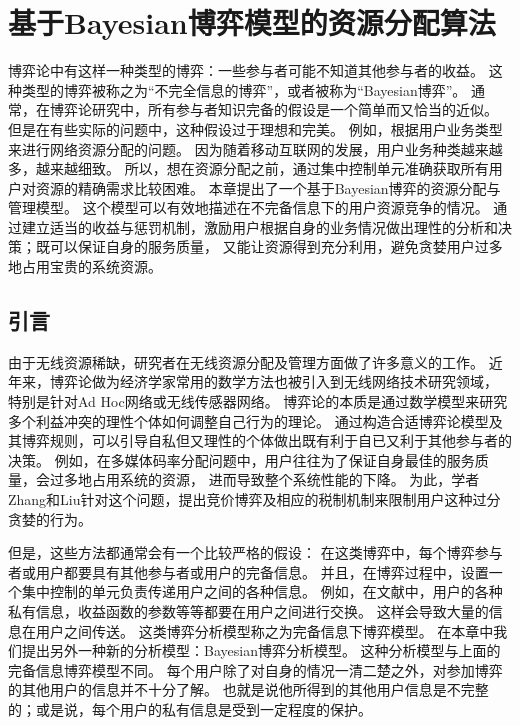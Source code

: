 \graphicspath{{../body/bayesian_figures/}}
\chapter{基于Bayesian博弈模型的资源分配算法}
\par 博弈论中有这样一种类型的博弈：一些参与者可能不知道其他参与者的收益。
这种类型的博弈被称之为“不完全信息的博弈”，或者被称为“Bayesian博弈”。
通常，在博弈论研究中，所有参与者知识完备的假设是一个简单而又恰当的近似。
但是在有些实际的问题中，这种假设过于理想和完美。
例如，根据用户业务类型来进行网络资源分配的问题。
因为随着移动互联网的发展，用户业务种类越来越多，越来越细致。
所以，想在资源分配之前，通过集中控制单元准确获取所有用户对资源的精确需求比较困难。
本章提出了一个基于Bayesian博弈的资源分配与管理模型。
这个模型可以有效地描述在不完备信息下的用户资源竞争的情况。
通过建立适当的收益与惩罚机制，激励用户根据自身的业务情况做出理性的分析和决策；既可以保证自身的服务质量，
又能让资源得到充分利用，避免贪婪用户过多地占用宝贵的系统资源。
%
\section{引言}
由于无线资源稀缺，研究者在无线资源分配及管理方面做了许多意义的工作。
近年来，博弈论做为经济学家常用的数学方法也被引入到无线网络技术研究领域，
特别是针对Ad Hoc网络或无线传感器网络\cite{Srivastava:2005}\cite{FangBensaou2004}。
博弈论的本质是通过数学模型来研究多个利益冲突的理性个体如何调整自己行为的理论。
通过构造合适博弈论模型及其博弈规则，可以引导自私但又理性的个体做出既有利于自已又利于其他参与者的决策。
例如，在多媒体码率分配问题中，用户往往为了保证自身最佳的服务质量，会过多地占用系统的资源，
进而导致整个系统性能的下降。
为此，学者Zhang和Liu针对这个问题，提出竞价博弈及相应的税制机制来限制用户这种过分贪婪的行为\cite{ZhangLiu2011}。

但是，这些方法都通常会有一个比较严格的假设：
在这类博弈中，每个博弈参与者或用户都要具有其他参与者或用户的完备信息。
并且，在博弈过程中，设置一个集中控制的单元负责传递用户之间的各种信息。
例如，在文献\cite{ZhangLiu2011}中，用户的各种私有信息，收益函数的参数等等都要在用户之间进行交换。
这样会导致大量的信息在用户之间传送。
这类博弈分析模型称之为完备信息下博弈模型。
在本章中我们提出另外一种新的分析模型：Bayesian博弈分析模型。
这种分析模型与上面的完备信息博弈模型不同。
每个用户除了对自身的情况一清二楚之外，对参加博弈的其他用户的信息并不十分了解。
也就是说他所得到的其他用户信息是不完整的；或是说，每个用户的私有信息是受到一定程度的保护。
